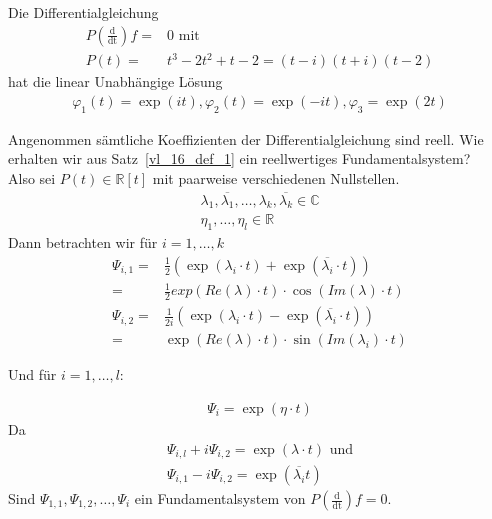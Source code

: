 \begin{Beispiel}{
	Die Differentialgleichung 
	\begin{align*}
		P\left( \frac{\mathrm{d}}{\mathrm{dt}}\right) f = & 0  \text{ mit} \\
		P(t) =  & t^3 -2t^2 + t -2 = (t -i) (t+i)(t-2)
 	\end{align*}
 	hat die linear Unabhängige Lösung
 	\begin{align*}
 		\varphi_1(t) = \exp(it), \varphi_2(t) = \exp(-it), \varphi_3 = \exp(2t)
 	\end{align*}
}\end{Beispiel}

Angenommen sämtliche Koeffizienten der Differentialgleichung sind reell. Wie erhalten wir 
aus Satz~\ref{vl_16_def_1}  ein reellwertiges Fundamentalsystem? \\
Also sei $P(t) \in \mathbb{R}[t]$ mit paarweise verschiedenen Nullstellen.
\begin{align*}
	\lambda_1, \overline{\lambda_1}, \hdots, \lambda_k, \overline{\lambda_k} \in 
		\mathbb{C} \\
	\eta_1, \hdots, \eta_l \in \mathbb{R}
\end{align*}
Dann betrachten wir für $i = 1, \hdots,k$ 
\begin{align*}
	\Psi_{i,1} = & \frac{1}{2} \left( \exp(\lambda_i \cdot t) + 
			\exp(\overline{\lambda_i}\cdot t)\right) \\
		= &\frac{1}{2} exp(Re(\lambda) \cdot t)\cdot \cos(Im(\lambda) \cdot t) \\	
	\Psi_{i,2} = & \frac{1}{2i} \left( \exp(\lambda_i \cdot t) - 
			\exp(\overline{\lambda_i} \cdot t)\right) \\
		= & \exp(Re(\lambda)\cdot t) \cdot \sin(Im(\lambda_i) \cdot t)	
\end{align*}
\begin{center}
	Und für $i = 1, \hdots, l$: 
\end{center}
\begin{align*}
	\Psi_i = \exp(\eta \cdot t)
\end{align*}
Da 
\begin{align*}
	\Psi_{i,l} + i \Psi_{i,2} = \exp(\lambda \cdot t) \text{ und} \\
	\Psi_{i,1} - i \Psi_{i,2} = \exp(\overline{\lambda_i} t) 
\end{align*}
Sind $\Psi_{1,1},\Psi_{1,2}, \hdots, \Psi_i$ 
ein Fundamentalsystem von $P\left(\frac{\mathrm{d}}{\mathrm{dt}}\right) f = 0$.